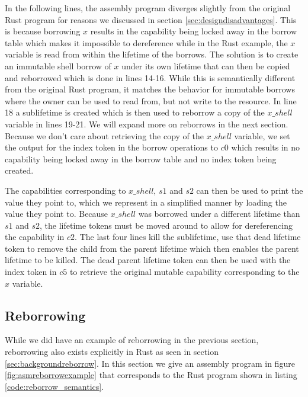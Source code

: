 In the following lines, the assembly program diverges slightly from the original Rust program for reasons we discussed in section \ref{sec:designdisadvantages}.
This is because borrowing $x$ results in the capability being locked away in the borrow table which makes it impossible to dereference while in the Rust example, the $x$ variable is read from within the lifetime of the borrows.
The solution is to create an immutable shell borrow of $x$ under its own lifetime that can then be copied and reborrowed which is done in lines 14-16.
While this is semantically different from the original Rust program, it matches the behavior for immutable borrows where the owner can be used to read from, but not write to the resource.
In line 18 a sublifetime is created which is then used to reborrow a copy of the $x\_shell$ variable in lines 19-21.
We will expand more on reborrows in the next section.
Because we don't care about retrieving the copy of the $x\_shell$ variable, we set the output for the index token in the borrow operations to $c0$ which results in no capability being locked away in the borrow table and no index token being created.

The capabilities corresponding to $x\_shell$, $s1$ and $s2$ can then be used to print the value they point to, which we represent in a simplified manner by loading the value they point to.
Because $x\_shell$ was borrowed under a different lifetime than $s1$ and $s2$, the lifetime tokens must be moved around to allow for dereferencing the capability in $c2$.
The last four lines kill the sublifetime, use that dead lifetime token to remove the child from the parent lifetime which then enables the parent lifetime to be killed.
The dead parent lifetime token can then be used with the index token in $c5$ to retrieve the original mutable capability corresponding to the $x$ variable.

\subsection{Reborrowing}
While we did have an example of reborrowing in the previous section, reborrowing also exists explicitly in Rust as seen in section \ref{sec:backgroundreborrow}.
In this section we give an assembly program in figure \ref{fig:asmreborrowexample} that corresponds to the Rust program shown in listing \ref{code:reborrow_semantics}.


